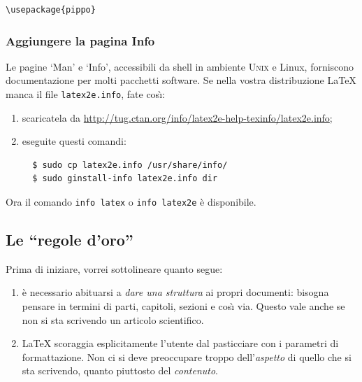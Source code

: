 \documentclass[a4paper,11pt]{article}
\def\unix    {\textsc{Unix}}
\newcommand{\cmdline}[1]
{\texttt{#1}}
\newcommand{\file}[1]
{\texttt{#1}}
\begin{document}
\begin{verbatim}
\usepackage{pippo}
\end{verbatim}


\subsubsection{Aggiungere la pagina Info}
\label{sec:infopage}

Le pagine `Man' e `Info', accessibili da shell in ambiente \unix{} e
Linux, forniscono documentazione per molti pacchetti software. Se
nella vostra distribuzione \LaTeX{} manca il file \file{latex2e.info},
fate cos\`\i{}:

\begin{enumerate}
  
  \item scaricatela da 
  \url{http://tug.ctan.org/info/latex2e-help-texinfo/latex2e.info};
  
  \item eseguite questi comandi:
  
  \begin{verbatim}
  $ sudo cp latex2e.info /usr/share/info/
  $ sudo ginstall-info latex2e.info dir
  \end{verbatim}
   
\end{enumerate}

Ora il comando \cmdline{info latex} o \cmdline{info latex2e} \`e
disponibile.




\subsection{Le ``regole d'oro''}

Prima di iniziare, vorrei sottolineare quanto segue:

\begin{enumerate}

  \item \`e necessario abituarsi a \emph{dare una struttura} ai propri
  documenti: bisogna pensare in termini di parti, capitoli, sezioni e
  cos\`\i{} via. Questo vale anche se non si sta scrivendo un articolo
  scientifico.
  
  \item \label{rule:mess} \LaTeX{} scoraggia esplicitamente l'utente
  dal pasticciare con i parametri di formattazione. Non ci si deve
  preoccupare troppo dell'\emph{aspetto} di quello che si sta
  scrivendo, quanto piuttosto del \emph{contenuto}.

\end{enumerate}
\end{document}
